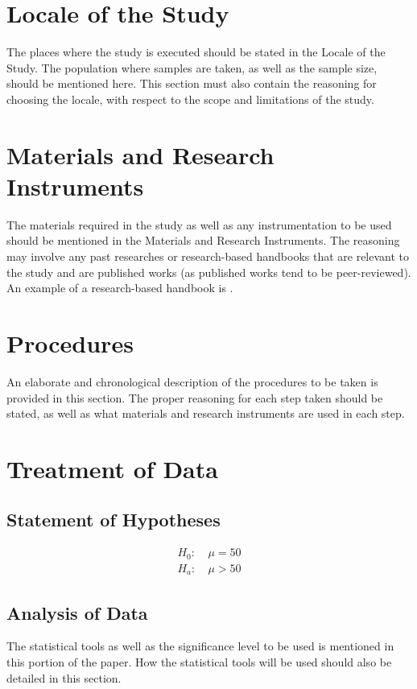 \documentclass{strrespaper-trad}
\begin{document}
		\section{Locale of the Study}
			The places where the study is executed should be stated in the Locale of the Study.
			The population where samples are taken, as well as the sample size, should be mentioned here.
			This section must also contain the reasoning for choosing the locale, with respect to the scope and limitations of the study.

		\section{Materials and Research Instruments}
			The materials required in the study as well as any instrumentation to be used should be mentioned in the Materials and Research Instruments.
			The reasoning may involve any past researches or research-based handbooks that are relevant to the study and are published works (as published works tend to be peer-reviewed).
			An example of a research-based handbook is \textcite{letcherWindEnergyEngineering2017}.

		\section{Procedures}
			An elaborate and chronological description of the procedures to be taken is provided in this section.
			The proper reasoning for each step taken should be stated, as well as what materials and research instruments are used in each step.

		\section{Treatment of Data}
			\subsection{Statement of Hypotheses} \vspace{-\baselineskip}
				\begin{align*}
					H_0: & ~ \mu = 50 \\
					H_a: & ~ \mu > 50
				\end{align*}
			\subsection{Analysis of Data}
				The statistical tools as well as the significance level to be used is mentioned in this portion of the paper.
				How the statistical tools will be used should also be detailed in this section.
\end{document}
